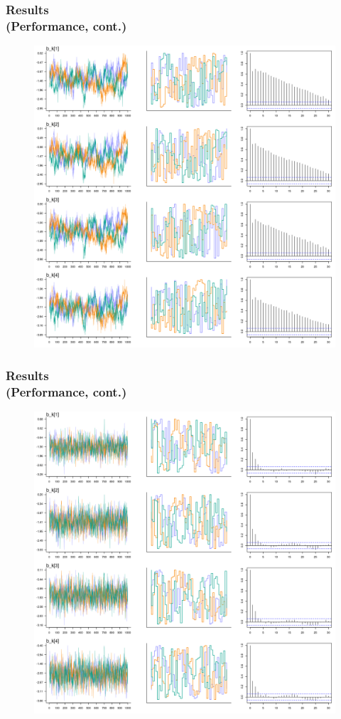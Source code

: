 \documentclass[arial,12pt,xcolor=dvipsnames]{beamer}
\begin{document}
%
\begin{frame}
	\frametitle{Results \\
		(Performance, cont.)}
	\begin{figure}[H]
		\centering
		\includegraphics[width=0.65\linewidth]{FOLV_CE_J100_Ndata1_bk1}
		\label{fig:FOLV_CE_chains3}
	\end{figure} 
\end{frame}
%
\begin{frame}
	\frametitle{Results \\
		(Performance, cont.)}
	\begin{figure}[H]
		\centering
		\includegraphics[width=0.65\linewidth]{FOLV_NC_J100_Ndata1_bk1}
	\end{figure} 
\end{frame}
%
\end{document}
